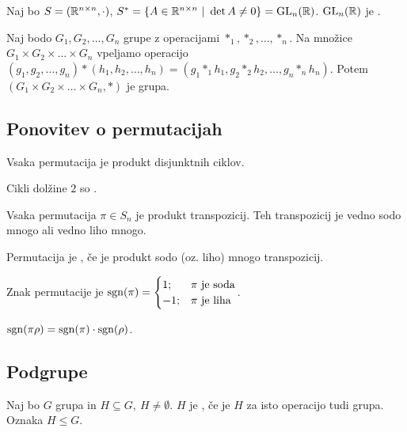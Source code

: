 \begin{primer}
    Naj bo $S = (\mathbb{R}^{n \times n}, \cdot)$, $S^* = \left\{A \in \mathbb{R}^{n \times n} \ | \ \det A \neq 0\right\} = \operatorname{GL}_n(\mathbb{R})$. $\operatorname{GL}_n(\mathbb{R})$ je .
\end{primer}

\begin{zgled}
    Naj bodo $G_1, G_2, \ldots, G_n$ grupe z operacijami $*_1, *_2, \ldots, *_n$. Na množice $G_1 \times G_2 \times \ldots \times G_n$ vpeljamo operacijo $(g_1, g_2, \ldots, g_n) * (h_1, h_2, \ldots, h_n) = (g_1 *_1 h_1, g_2 *_2 h_2, \ldots, g_n *_n h_n)$. Potem $(G_1 \times G_2 \times \ldots \times G_n, *)$ je grupa. 
\end{zgled}

\subsection{Ponovitev o permutacijah}
\begin{izrek}
    Vsaka permutacija je produkt disjunktnih ciklov.
\end{izrek}

\begin{definicija}
    Cikli dolžine $2$ so .
\end{definicija}

\begin{trditev}
    Vsaka permutacija $\pi \in S_n$ je produkt transpozicij. Teh transpozicij je vedno sodo mnogo ali vedno liho mnogo.
\end{trditev}

\begin{definicija}
    Permutacija je , če je produkt sodo (oz. liho) mnogo transpozicij.
\end{definicija}

\begin{definicija}
    Znak permutacije je $\operatorname{sgn}(\pi) = \begin{cases}
        1; &\pi \text{ je soda} \\
        -1; &\pi \text{ je liha}
    \end{cases}$.
\end{definicija}

\begin{trditev}
    $\operatorname{sgn}(\pi \rho) = \operatorname{sgn}(\pi) \cdot \operatorname{sgn}(\rho)$.
\end{trditev}

\subsection{Podgrupe}
\begin{definicija}
    Naj bo $G$ grupa in $H \subseteq G, \ H \neq \emptyset$. $H$ je , če je $H$ za isto operacijo tudi grupa. Oznaka $H \leq G$.
\end{definicija}

